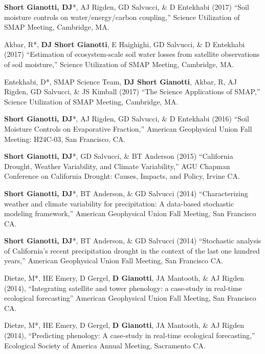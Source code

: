 \documentclass[10pt, a4paper]{article}
\newcommand{\lbr}{\vspace*{4pt}}
\newcommand{\years}[1]{\marginnote{\scriptsize #1}}
\begin{document}
\years{2017}\textbf{Short Gianotti, DJ}*, AJ Rigden, GD Salvucci, \& D Entekhabi (2017) ``Soil moisture controls on water/energy/carbon coupling,'' Science Utilization of SMAP Meeting, Cambridge, MA.\lbr

\years{2017}Akbar, R*, \textbf{DJ Short Gianotti}, E Haighighi, GD Salvucci, \& D Entekhabi (2017) ``Estimation of ecosystem-scale soil water losses from satellite observations of soil moisture,'' Science Utilization of SMAP Meeting, Cambridge, MA.\lbr %

\years{2017}Entekhabi, D*, SMAP Science Team, \textbf{DJ Short Gianotti}, Akbar, R, AJ Rigden, GD Salvucci, \& JS Kimball (2017) ``The Science Applications of SMAP,'' Science Utilization of SMAP Meeting, Cambridge, MA.\lbr %

\years{2016}\textbf{Short Gianotti, DJ}*, AJ Rigden, GD Salvucci, \& D Entekhabi (2016) ``Soil Moisture Controls on Evaporative Fraction,'' American Geophysical Union Fall Meeting: H24C-03, San Francisco, CA.\lbr

\years{2015}\textbf{Short Gianotti, DJ}*, GD Salvucci, \& BT Anderson (2015) ``California Drought, Weather Variability, and Climate Variability,'' AGU Chapman Conference on California Drought: Causes, Impacts, and Policy, Irvine CA.\lbr

\years{2014}\textbf{Short Gianotti, DJ}*, BT Anderson, \& GD Salvucci (2014) ``Characterizing weather and climate variability for precipitation: A data-based stochastic modeling framework,'' American Geophysical Union Fall Meeting, San Francisco CA.\lbr

\years{2014}\textbf{Short Gianotti, DJ}*, BT Anderson, \& GD Salvucci (2014) ``Stochastic analysis of California's recent precipitation drought in the context of the last one hundred years,'' American Geophysical Union Fall Meeting, San Francisco CA.\lbr

\years{2014}Dietze, M*, HE Emery, D Gergel, \textbf{D Gianotti}, JA Mantooth, \& AJ Rigden (2014), ``Integrating satellite and tower phenology: a case-study in real-time ecological forecasting'' American Geophysical Union Fall Meeting, San Francisco CA.\lbr

\years{2014}Dietze, M*, HE Emery, D Gergel, \textbf{D Gianotti}, JA Mantooth, \& AJ Rigden (2014), ``Predicting phenology: A case-study in real-time ecological forecasting,'' Ecological Society of America Annual Meeting, Sacramento CA.\lbr
\end{document}
